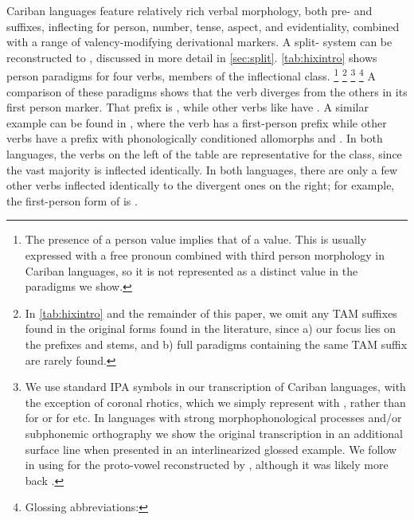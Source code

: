 

Cariban languages feature relatively rich verbal morphology, both pre- and suffixes, inflecting for person, number, tense, aspect, and evidentiality, combined with a range of valency-modifying derivational markers.
A split- system can be reconstructed to \PC, discussed in more detail in \cref{sec:split}.
\cref{tab:hixintro} shows person paradigms for four \hixka verbs, members of the  inflectional class.%
\footnote{The presence of a  person value implies that of a  value.
This is usually expressed with a free pronoun combined with third person morphology in Cariban languages, so it is not represented as a distinct value in the paradigms we show.}%
\footnote{In \cref{tab:hixintro} and the remainder of this paper, we omit any TAM suffixes found in the original forms found in the literature, since a) our focus lies on the prefixes and stems, and b) full paradigms containing the same TAM suffix are rarely found.}%
\footnote{
We use standard IPA symbols in our transcription of Cariban languages, with the exception of coronal rhotics, which we simply represent with , rather than  for \wayana or  for \maqui etc.
In languages with strong morphophonological processes and/or subphonemic orthography we show the original transcription in an additional surface line when presented in an interlinearized glossed example.
We follow \textcite{gildea2018reconstructing} in using  for the proto-vowel reconstructed by \textcite{meira2005southern}, although it was likely more back \parencite{gildea2010story}.}
\footnote{Glossing abbreviations: }%
A comparison of these paradigms shows that the verb  diverges from the others in its first person marker.
That prefix is , while other  verbs like  have .
A similar example can be found in \trio, where the verb  has a first-person prefix  while other  verbs have a prefix with phonologically conditioned allomorphs  and  .
In both languages, the verbs on the left of the table are representative for the  class, since the vast majority is inflected identically.
In both languages, there are only a few other verbs inflected identically to the divergent ones on the right; for example, the first-person form of \trio {} is  \parencites[339]{triomeira1999}.

